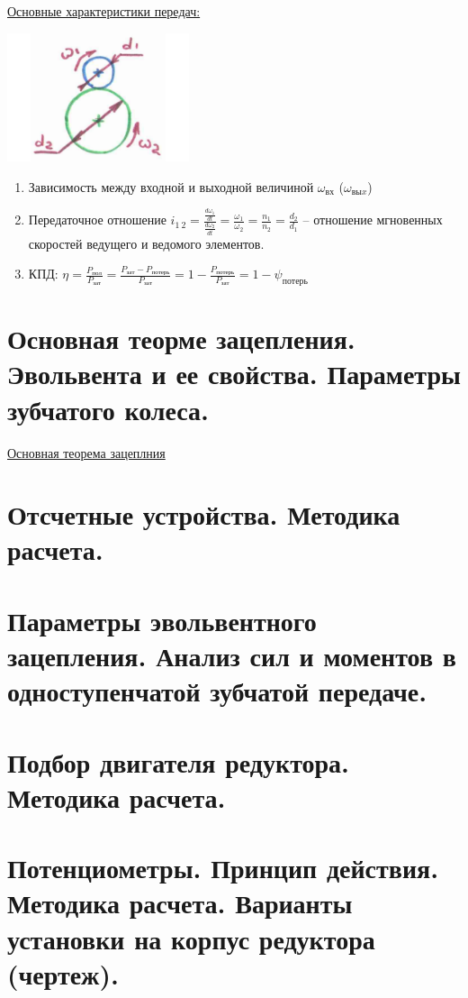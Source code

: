\documentclass{article}
\begin{document}
\underline{Основные характеристики передач:}

\includegraphics[width = 0.4\textwidth]{6_1}

\begin{enumerate}
	\item Зависимость между входной и выходной величиной $\omega_{вх}$ ($\omega_{выx}$)
	\item Передаточное отношение $i_{1\:2} = \frac{ \frac{d\omega_1}{dt} }{ \frac{d\omega_2}{dt} } = \frac{\omega_1}{\omega_2} = \frac{n_1}{n_2} = \frac{d_2}{d_1} $ -- отношение
	мгновенных скоростей ведущего и ведомого элементов.
	\item  КПД: $\eta = \frac{P_{пол}}{P_{зат}} = \frac{P_{зат} - P_{потерь}}{P_{зат}} = 1 - \frac{P_{потерь}}{P_{зат}} = 1 - \psi_{потерь} $
\end{enumerate}

\section {Основная теорме зацепления. Эвольвента и ее свойства. Параметры зубчатого колеса.}

\underline{Основная теорема зацеплния} 

\section {Отсчетные устройства. Методика расчета.}

\section {Параметры эвольвентного зацепления. Анализ сил и моментов в одноступенчатой зубчатой передаче.}

\section {Подбор двигателя редуктора. Методика расчета.}

\section {Потенциометры. Принцип действия. Методика расчета. Варианты установки на корпус редуктора (чертеж).}
\end{document}
